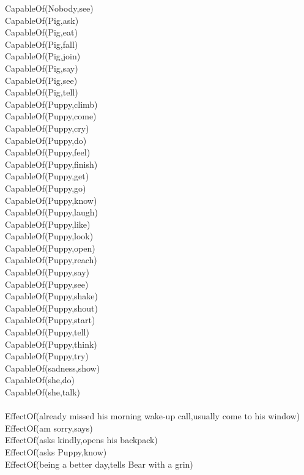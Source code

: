 \begin{multicols}{2}
\begin{footnotesize}
CapableOf(Nobody,see) \\
CapableOf(Pig,ask) \\
CapableOf(Pig,eat) \\
CapableOf(Pig,fall) \\
CapableOf(Pig,join) \\
CapableOf(Pig,say) \\
CapableOf(Pig,see) \\
CapableOf(Pig,tell) \\
CapableOf(Puppy,climb) \\
CapableOf(Puppy,come) \\
CapableOf(Puppy,cry) \\
CapableOf(Puppy,do) \\
CapableOf(Puppy,feel) \\
CapableOf(Puppy,finish) \\
CapableOf(Puppy,get) \\
CapableOf(Puppy,go) \\
CapableOf(Puppy,know) \\
CapableOf(Puppy,laugh) \\
CapableOf(Puppy,like) \\
CapableOf(Puppy,look) \\
CapableOf(Puppy,open) \\
CapableOf(Puppy,reach) \\
CapableOf(Puppy,say) \\
CapableOf(Puppy,see) \\
CapableOf(Puppy,shake) \\
CapableOf(Puppy,shout) \\
CapableOf(Puppy,start) \\
CapableOf(Puppy,tell) \\
CapableOf(Puppy,think) \\
CapableOf(Puppy,try) \\
CapableOf(sadness,show) \\
CapableOf(she,do) \\
CapableOf(she,talk) \\
~\\
EffectOf(already missed his morning wake-up call,usually come to his window) \\
EffectOf(am sorry,says) \\
EffectOf(asks kindly,opens his backpack) \\
EffectOf(asks Puppy,know) \\
EffectOf(being a better day,tells Bear with a grin) \\

\end{footnotesize}
\end{multicols}
